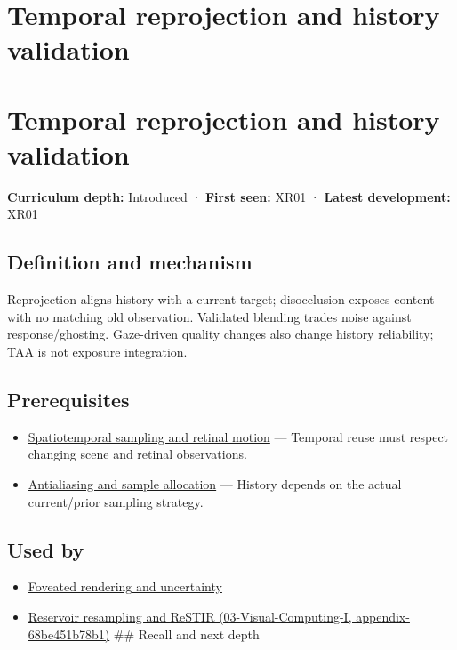 \hypertarget{appendix-0727340a4428}{}
\section*{Temporal reprojection and history validation}
\section{Temporal reprojection and history validation}\label{appendix-0727340a4428-temporal-reprojection-and-history-validation}

\textbf{Curriculum depth:} Introduced · \textbf{First seen:} XR01 · \textbf{Latest development:} XR01

\subsection{Definition and mechanism}\label{appendix-0727340a4428-definition-and-mechanism}

Reprojection aligns history with a current target; disocclusion exposes content with no matching old observation. Validated blending trades noise against response/ghosting. Gaze-driven quality changes also change history reliability; TAA is not exposure integration.

\subsection{Prerequisites}\label{appendix-0727340a4428-prerequisites}

\begin{itemize}
\tightlist
\item
  \hyperref[appendix-70895739febb]{Spatiotemporal sampling and retinal motion} --- Temporal reuse must respect changing scene and retinal observations.
\item
  \hyperref[appendix-4192b2bdd21e]{Antialiasing and sample allocation} --- History depends on the actual current/prior sampling strategy.
\end{itemize}

\subsection{Used by}\label{appendix-0727340a4428-used-by}

\begin{itemize}
\item
  \hyperref[appendix-5878b813b732]{Foveated rendering and uncertainty}
\item
  \href{../03-Visual-Computing-I/main.pdf\#nameddest=appendix-68be451b78b1}{Reservoir resampling and ReSTIR (03-Visual-Computing-I, appendix-68be451b78b1)} \#\# Recall and next depth
\end{itemize}

